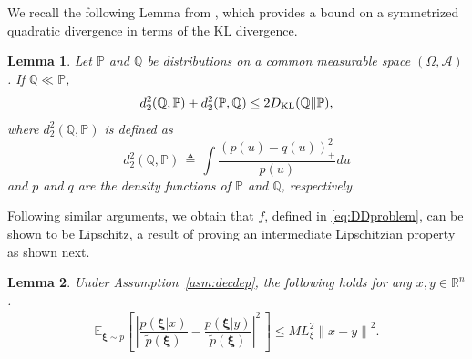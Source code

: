 \documentclass[11pt,reqno]{amsart}
\newcommand{\1}{{\bf 1}}
\newcommand{\2}{{\bf 2}}
\newcommand{\pc}[1]{{\color{cyan}#1}}
\newcommand{\us}[1]{\textcolor{red}{#1}}
\newcommand{\bxi}{\boldsymbol{\xi}}
\newcommand{\E}{\mathbb E}
\newcommand{\R}{\mathbb R}
\newcommand{\PP}{\mathbb P}
\newcommand{\Q}{\mathbb Q}
\newcommand{\lln}{\left|}
\newcommand{\rrn}{\right|}
\numberwithin{equation}{section}
\newtheorem{lemma}{Lemma}[section]
\theoremstyle{remark}
\begin{document}
{{				We recall the following Lemma from \cite[Lemma 8.4]{boucheron2013concentration}, which provides a bound on {a symmetrized quadratic divergence} in terms of the KL {divergence}.
				\begin{lemma}\label{lem:d-2-ineq}
					Let $ \mathbb{P} $ and $ \mathbb{Q} $ be distributions on a common measurable space $ (\Omega, \mathcal{A}) $. If $ \mathbb{Q} \ll \mathbb{P} $,
					\begin{equation*}
						d_{2}^{2}(\mathbb{Q}, \mathbb{P})+d_{2}^{2}(\mathbb{P}, \mathbb{Q}) \leq 2 D_{{\textnormal{KL}}}(\mathbb{Q} \| \mathbb{P}),
					\end{equation*}
					where $d_{2}^{2}(\mathbb{Q}, \mathbb{P})$ is defined as
					\begin{equation*}
						d_{2}^{2}(\mathbb{Q}, \mathbb{P}) \, \triangleq \, \int \frac{(p(u)-q(u))_{+}^{2}}{p(u)} d u
					\end{equation*}
					and $p$ and $q$ are the density functions of $\mathbb{P}$ and $\Q$, respectively. %
				\end{lemma}
				
				Following similar arguments, we obtain that $f$, defined in \eqref{eq:DDproblem}, can be shown to be Lipschitz, a result of proving an intermediate Lipschitzian property as shown next.
				\begin{lemma}\label{lem:Epx-py}
					Under Assumption~\ref{asm:decdep}, the following holds for any $x, y \in \R^n$.
					\begin{align}\label{inter_lip}
						\E_{\bxi \sim \tilde{p}} \left[ \, {\lln \dfrac{p(\bxi | x)}{\tilde{p}(\bxi)} - \dfrac{p(\bxi | y)}{\tilde{p}(\bxi)} \rrn}^2 \, \right] \leq M L_\xi^2 {{\|x-y\|}}^2.
					\end{align}
				\end{lemma}
				
}}
\end{document}
